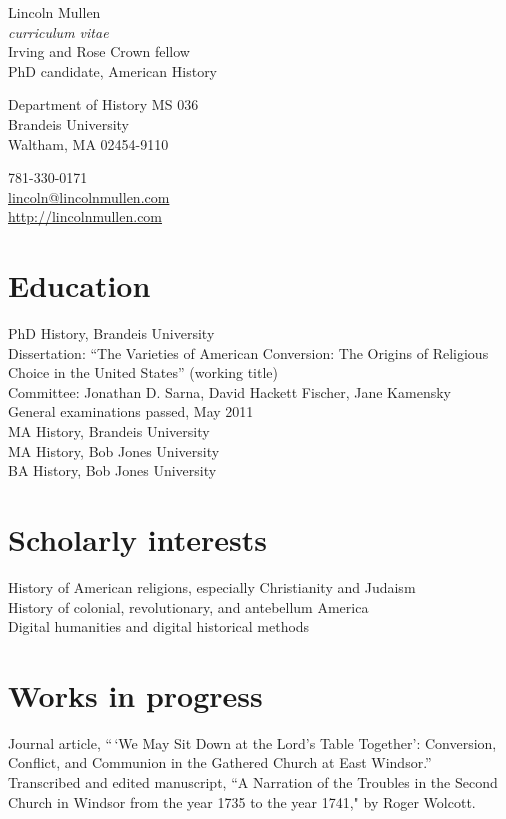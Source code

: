 \documentclass[11pt]{article}
\newcommand{\years}[1]{\marginnote{\scriptsize #1}}
\begin{document}
{\LARGE Lincoln Mullen}\\
\emph{curriculum vitae}\\[1cm]

Irving and Rose Crown fellow\\
PhD candidate, American History

\begin{multicols}{2}
Department of History MS 036\\
Brandeis University\\
Waltham, MA 02454-9110

\columnbreak

781-330-0171\\
\href{mailto:lincoln@lincolnmullen.com}{lincoln@lincolnmullen.com}\\
\href{http://lincolnmullen.com}{http://lincolnmullen.com}
\end{multicols}


\vfill


\section*{Education}
\noindent
\years{2009--}PhD History, Brandeis University\\[.05cm]
	Dissertation: ``The Varieties of American Conversion: The Origins of Religious Choice in the United States'' (working title)\\
	Committee:  Jonathan D. Sarna, David Hackett Fischer, Jane Kamensky\\
	General examinations passed, May 2011\\[.2cm]
\years{2011}MA History, Brandeis University\\
\years{2008}MA History, Bob Jones University\\
\years{2006}BA History, Bob Jones University

\section*{Scholarly interests}
History of American religions, especially Christianity and Judaism\\
History of colonial, revolutionary, and antebellum America\\
Digital humanities and digital historical methods

\section*{Works in progress}
Journal article, ``\,`We May Sit Down at the Lord's Table Together': Conversion,  Conflict, and Communion in the Gathered Church at East Windsor.''\\[.05cm]
Transcribed and edited manuscript, ``A Narration of the Troubles in the Second Church in Windsor from the year 1735 to the year 1741," by Roger Wolcott.
\end{document}

